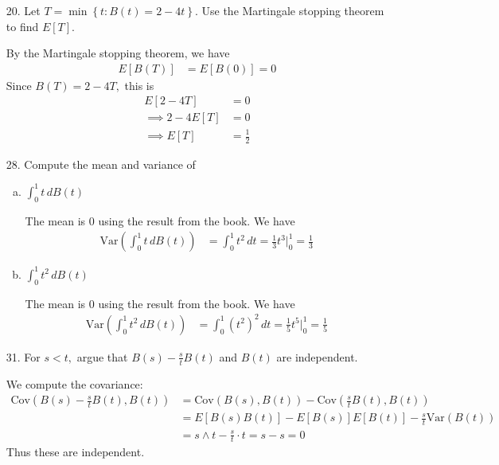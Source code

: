 \documentclass{article}
\newcommand{\var}{\mathrm{Var}}
\newcommand{\cov}{\mathrm{Cov}}
\begin{document}
\begin{itemize}
	\item[20.] Let $T=\min\left\{ t:B(t)=2-4t \right\}.$ Use the Martingale stopping theorem to find $E[T].$
		\begin{soln}
			By the Martingale stopping theorem, we have
			\begin{align*}
				E[B(T)] &= E[B(0)] = 0
			\end{align*}
			Since $B(T) = 2-4T,$ this is
			\begin{align*}
				E[2-4T] &= 0 \\
				\implies 2- 4E[T] &= 0 \\
				\implies E[T] &= \frac{1}{2}
			\end{align*}
		\end{soln}

	\item[28.] Compute the mean and variance of
		\begin{enumerate}[(a)]
			\item $\int_0^1 t\, d B(t)$
				\begin{soln}
					The mean is 0 using the result from the book. We have
					\begin{align*}
						\var\left( \int_0^1 t\, dB(t) \right) &= \int_0^1 t^2\, dt = \frac{1}{3} t^3\bigg\vert_0^1 = \frac{1}{3}
					\end{align*}
				\end{soln}

			\item $\int_0^1 t^2\, dB(t)$
				\begin{soln}
					The mean is 0 using the result from the book. We have
					\begin{align*}
						\var\left( \int_0^1 t^2\, dB(t) \right) &= \int_0^1 (t^2)^2\, dt = \frac{1}{5} t^5\bigg\vert_0^1 = \frac{1}{5}
					\end{align*}
				\end{soln}
				
		\end{enumerate}

	\item[31.] For $s<t,$ argue that $B(s)-\frac{s}{t} B(t)$ and $B(t)$ are independent.
		\begin{soln}
			We compute the covariance:
			\begin{align*}
				\cov\left( B(s)-\frac{s}{t} B(t), B(t) \right) &= \cov(B(s), B(t)) - \cov\left( \frac{s}{t} B(t), B(t) \right) \\
				&= E[B(s) B(t)] - E[B(s)]E[B(t)] - \frac{s}{t} \var(B(t)) \\
				&= s\wedge t - \frac{s}{t}\cdot t = s - s = 0
			\end{align*}
			Thus these are independent.
		\end{soln}
	
\end{itemize}
\end{document}
